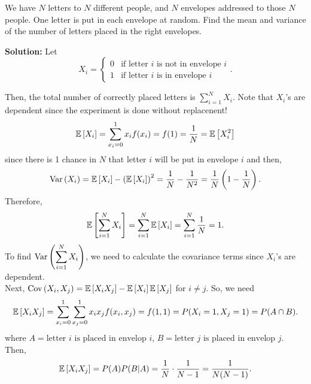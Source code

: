 \pagebreak

\begin{example}
    We have $N$ letters to $N$ different people, and $N$ envelopes addressed to those $N$ people. One letter is put in each envelope at random. Find the mean and variance of the number of letters placed in the right envelopes.

    \textbf{Solution:}
    Let
    \[
        X_i = 
        \begin{cases} 
            0 & \text{if letter $i$ is not in envelope $i$} \\
            1 & \text{if letter $i$ is in envelope $i$}
        \end{cases}.
    \]

    Then, the total number of correctly placed letters is $\displaystyle \sum_{i=1}^{N} X_i$. Note that $X_i$'s are dependent since the experiment is done without replacenent!
    \[
        \mathbb{E}\left[{X_i}\right] = \displaystyle \sum_{x_i=0}^{1} x_if(x_i) = f(1) = \frac{1}{N} = \mathbb{E}\left[{X_i^2}\right]
    \]
    since there is 1 chance in $N$ that letter $i$ will be put in envelope $i$ and then,
    \[
        \operatorname{Var}\left({X_i}\right) = \mathbb{E}\left[{X_i}\right] - \left( \mathbb{E}\left[{X_i}\right] \right)^2 = \frac{1}{N} - \frac{1}{N^2} = \frac{1}{N}\left( 1 - \frac{1}{N} \right).
    \]
    Therefore,
    \[
        \mathbb{E}\left[{\displaystyle \sum_{i=1}^{N} X_i}\right] = \displaystyle \sum_{i=1}^{N} \mathbb{E}\left[{X_i}\right] = \displaystyle \sum_{i=1}^{N} \frac{1}{N} = 1.
    \]
    To find $\operatorname{Var}\left({\displaystyle \sum_{i=1}^{N} X_i}\right)$, we need to calculate the covariance terms since $X_i$'s are dependent. \\
    Next, $\operatorname{Cov}\left({X_i,X_j}\right) = \mathbb{E}\left[{X_i X_j}\right] - \mathbb{E}\left[{X_i}\right] \mathbb{E}\left[{X_j}\right]$ for $i \neq j$. So, we need
    \[
        \mathbb{E}\left[{X_i X_j}\right] = \displaystyle \sum_{x_i = 0}^{1} \displaystyle \sum_{x_j=0}^{1} x_i x_j f(x_i,x_j) = f(1,1) = P(X_i = 1, X_j = 1) = P(A \cap B).
    \]
    where $A = \text{letter $i$ is placed in envelop $i$}$, $B = \text{letter $j$ is placed in envelop $j$}$. Then,
    \[
        \mathbb{E}\left[{X_i X_j}\right] = P(A) P(B|A) = \frac{1}{N} \cdot \frac{1}{N-1} = \frac{1}{N(N-1)}.
    \]

    \pagebreak


\end{example}
